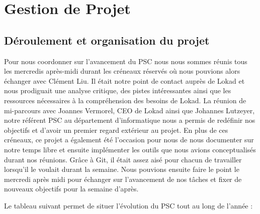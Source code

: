 \section{Gestion de Projet}

\subsection{Déroulement et organisation du projet}
Pour nous coordonner sur l’avancement du PSC nous nous sommes réunis tous les mercredis après-midi durant les créneaux réservés où nous pouvions alors échanger avec Clément Liu. Il était notre point de contact auprès de Lokad et nous prodiguait une analyse critique, des pistes intéressantes ainsi que les ressources nécessaires à la compréhension des besoins de Lokad. La réunion de mi-parcours avec Joannes Vermorel, CEO de Lokad ainsi que Johannes Lutzeyer, notre référent PSC au département d’informatique nous a permis de redéfinir nos objectifs et d’avoir un premier regard  extérieur au projet.
En plus de ces créneaux, ce projet a également été l’occasion pour nous de nous documenter sur notre temps libre et ensuite implémenter les outils que nous avions conceptualisés durant nos réunions. Grâce à Git, il était assez aisé pour chacun de travailler lorsqu’il le voulait durant la semaine. Nous pouvions ensuite faire le point le mercredi après midi pour échanger sur l’avancement de nos tâches et fixer de nouveaux objectifs pour la semaine d’après.

Le tableau suivant permet de situer l’évolution du PSC tout au long de l’année :

